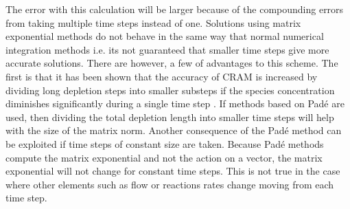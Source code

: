 \noindent The error with this calculation will be larger because of the compounding errors from taking multiple time steps instead of one. Solutions using matrix exponential methods do not behave in the same way that normal numerical integration methods i.e. its not guaranteed that smaller time steps give more accurate solutions. There are however, a few of advantages to this scheme. The first is that it has been shown that the accuracy of CRAM is increased by dividing long depletion steps into smaller substeps if the species concentration diminishes significantly during a single time step \cite{isotalo2016}. If methods based on Pad\'e are used, then dividing the total depletion length into smaller time steps will help with the size of the matrix norm. Another consequence of the Pad\'e method can be exploited if time steps of constant size are taken. Because Pad\'e methods compute the matrix exponential and not the action on a vector, the matrix exponential will not change for constant time steps. This is not true in the case where other elements such as flow or reactions rates change moving from each time step. 